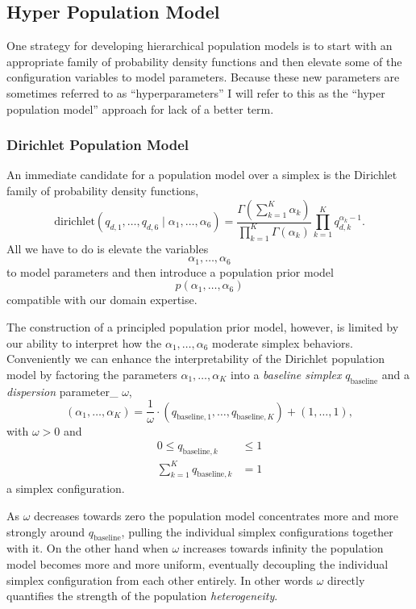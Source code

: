 \documentclass[
  letterpaper,
  DIV=11,
  numbers=noendperiod]{scrartcl}
\begin{document}
\subsection{Hyper Population Model}\label{sec:hyperpop}

One strategy for developing hierarchical population models is to start
with an appropriate family of probability density functions and then
elevate some of the configuration variables to model parameters. Because
these new parameters are sometimes referred to as ``hyperparameters'' I
will refer to this as the ``hyper population model'' approach for lack
of a better term.

\subsubsection{Dirichlet Population
Model}\label{dirichlet-population-model}

An immediate candidate for a population model over a simplex is the
Dirichlet family of probability density functions, \[
\mathrm{dirichlet}( q_{d, 1}, \ldots, q_{d, 6} \mid
                    \alpha_{1}, \ldots, \alpha_{6} )
=
\frac{ \Gamma \left( \sum_{k = 1}^{K} \alpha_{k} \right) }
{ \prod_{k = 1}^{K} \Gamma \left( \alpha_{k} \right) }
\prod_{k = 1}^{K} q_{d, k}^{\alpha_{k} - 1}.
\] All we have to do is elevate the variables \[
\alpha_{1}, \ldots, \alpha_{6}
\] to model parameters and then introduce a population prior model \[
p ( \alpha_{1}, \ldots, \alpha_{6} )
\] compatible with our domain expertise.

The construction of a principled population prior model, however, is
limited by our ability to interpret how the
\(\alpha_{1}, \ldots, \alpha_{6}\) moderate simplex behaviors.
Conveniently we can enhance the interpretability of the Dirichlet
population model by factoring the parameters
\(\alpha_{1}, \ldots, \alpha_{K}\) into a \emph{baseline simplex}
\(q_{\mathrm{baseline}}\) and a \emph{dispersion} parameter\_
\(\omega\), \[
( \alpha_{1}, \ldots, \alpha_{K} )
=
\frac{1}{\omega} \cdot
( q_{\mathrm{baseline}, 1}, \ldots, q_{\mathrm{baseline}, K} )
+ (1, \ldots, 1),
\] with \(\omega > 0\) and \begin{align*}
0 \le q_{\mathrm{baseline}, k} &\le 1
\\
\sum_{k = 1}^{K} q_{\mathrm{baseline}, k} &= 1
\end{align*} a simplex configuration.

As \(\omega\) decreases towards zero the population model concentrates
more and more strongly around \(q_{\mathrm{baseline}}\), pulling the
individual simplex configurations together with it. On the other hand
when \(\omega\) increases towards infinity the population model becomes
more and more uniform, eventually decoupling the individual simplex
configuration from each other entirely. In other words \(\omega\)
directly quantifies the strength of the population \emph{heterogeneity}.
\end{document}
